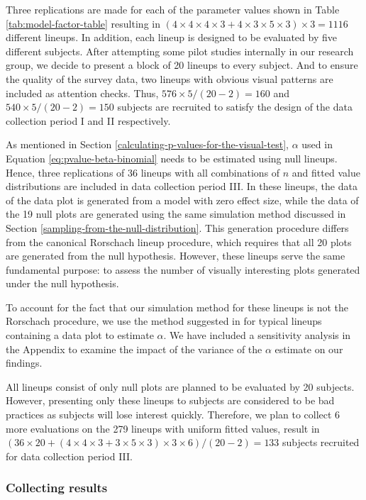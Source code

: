 \documentclass[]{interact}
\theoremstyle{plain}%
\theoremstyle{definition}
\theoremstyle{remark}
\begin{document}
Three replications are made for each of the parameter values shown in
Table \ref{tab:model-factor-table} resulting in
\((4 \times 4 \times 4 \times 3 + 4 \times 3 \times 5 \times 3) \times 3 = 1116\)
different lineups. In addition, each lineup is designed to be evaluated
by five different subjects. After attempting some pilot studies
internally in our research group, we decide to present a block of 20
lineups to every subject. And to ensure the quality of the survey data,
two lineups with obvious visual patterns are included as attention
checks. Thus, \(576 \times 5 / (20-2) = 160\) and
\(540 \times 5 / (20-2) = 150\) subjects are recruited to satisfy the
design of the data collection period I and II respectively.

As mentioned in Section \ref{calculating-p-values-for-the-visual-test},
\(\alpha\) used in Equation \ref{eq:pvalue-beta-binomial} needs to be
estimated using null lineups. Hence, three replications of 36 lineups
with all combinations of \(n\) and fitted value distributions are
included in data collection period III. In these lineups, the data of
the data plot is generated from a model with zero effect size, while the
data of the 19 null plots are generated using the same simulation method
discussed in Section \ref{sampling-from-the-null-distribution}. This
generation procedure differs from the canonical Rorschach lineup
procedure, which requires that all 20 plots are generated from the null
hypothesis. However, these lineups serve the same fundamental purpose:
to assess the number of visually interesting plots generated under the
null hypothesis.

To account for the fact that our simulation method for these lineups is
not the Rorschach procedure, we use the method suggested in
\citet{vanderplas2021statistical} for typical lineups containing a data
plot to estimate \(\alpha\). We have included a sensitivity analysis in
the Appendix to examine the impact of the variance of the \(\alpha\)
estimate on our findings.

All lineups consist of only null plots are planned to be evaluated by 20
subjects. However, presenting only these lineups to subjects are
considered to be bad practices as subjects will lose interest quickly.
Therefore, we plan to collect 6 more evaluations on the 279 lineups with
uniform fitted values, result in
\((36 \times 20 + (4 \times 4 \times 3 + 3 \times 5 \times 3) \times 3 \times 6) / (20-2) = 133\)
subjects recruited for data collection period III.

\hypertarget{collecting-results}{%
\subsubsection{Collecting results}\label{collecting-results}}
\end{document}

